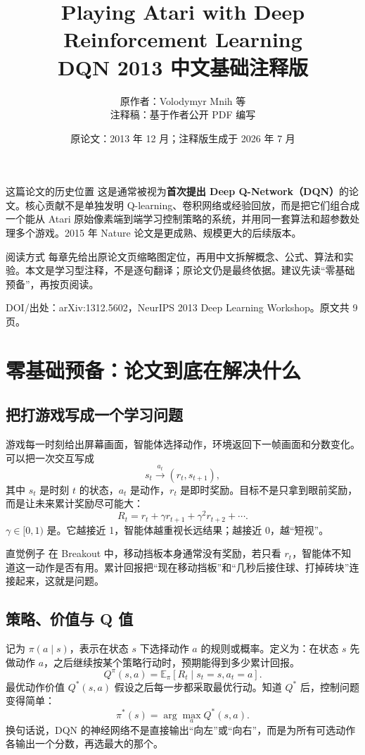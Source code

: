 \documentclass[UTF8,11pt]{ctexart}
\title{\bfseries\Huge Playing Atari with Deep Reinforcement Learning\\[3mm]\Large DQN 2013 中文基础注释版}
\author{原作者：Volodymyr Mnih 等\\注释稿：基于作者公开 PDF 编写}
\date{原论文：2013 年 12 月；注释版生成于 2026 年 7 月}
\begin{document}
\maketitle
\thispagestyle{empty}
\vfill
\begin{keybox}{这篇论文的历史位置}
这是通常被视为\textbf{首次提出 Deep Q-Network（DQN）}的论文。核心贡献不是单独发明 Q-learning、卷积网络或经验回放，而是把它们组合成一个能从 Atari 原始像素端到端学习控制策略的系统，并用同一套算法和超参数处理多个游戏。2015 年 Nature 论文是更成熟、规模更大的后续版本。
\end{keybox}
\begin{plainbox}{阅读方式}
每章先给出原论文页缩略图定位，再用中文拆解概念、公式、算法和实验。本文是学习型注释，不是逐句翻译；原论文仍是最终依据。建议先读“零基础预备”，再按页阅读。
\end{plainbox}
\vfill
\noindent\small DOI/出处：arXiv:1312.5602，NeurIPS 2013 Deep Learning Workshop。原文共 9 页。
\clearpage

\tableofcontents
\clearpage

\section{零基础预备：论文到底在解决什么}

\subsection{把打游戏写成一个学习问题}
游戏每一时刻给出屏幕画面，智能体选择动作，环境返回下一帧画面和分数变化。可以把一次交互写成
\[
  s_t \xrightarrow{\ a_t\ } (r_t,s_{t+1}),
\]
其中 $s_t$ 是时刻 $t$ 的状态，$a_t$ 是动作，$r_t$ 是即时奖励。目标不是只拿到眼前奖励，而是让未来累计奖励尽可能大：
\[
  R_t=r_t+\gamma r_{t+1}+\gamma^2r_{t+2}+\cdots.
\]
$\gamma\in[0,1)$ 是。它越接近 1，智能体越重视长远结果；越接近 0，越“短视”。

\begin{plainbox}{直觉例子}
在 Breakout 中，移动挡板本身通常没有奖励，若只看 $r_t$，智能体不知道这一动作是否有用。累计回报把“现在移动挡板”和“几秒后接住球、打掉砖块”连接起来，这就是问题。
\end{plainbox}

\subsection{策略、价值与 Q 值}
记为 $\pi(a\mid s)$，表示在状态 $s$ 下选择动作 $a$ 的规则或概率。定义为：在状态 $s$ 先做动作 $a$，之后继续按某个策略行动时，预期能得到多少累计回报。
\[
  Q^{\pi}(s,a)=\mathbb E_{\pi}[R_t\mid s_t=s,a_t=a].
\]
最优动作价值 $Q^*(s,a)$ 假设之后每一步都采取最优行动。知道 $Q^*$ 后，控制问题变得简单：
\[
  \pi^*(s)=\arg\max_a Q^*(s,a).
\]
换句话说，DQN 的神经网络不是直接输出“向左”或“向右”，而是为所有可选动作各输出一个分数，再选最大的那个。
\end{document}
